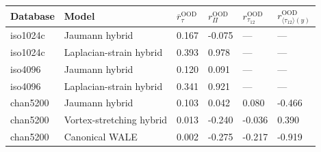 \begin{tabular}{llllll}
\toprule
Database & Model & $\overline{r}_{\tau}^{\mathrm{OOD}}$ & $r_{\Pi}^{\mathrm{OOD}}$ & $r_{\tau_{12}}^{\mathrm{OOD}}$ & $r_{\langle \tau_{12} \rangle (y)}^{\mathrm{OOD}}$ \\
\midrule
iso1024c & Jaumann hybrid & 0.167 & -0.075 & --- & --- \\
iso1024c & Laplacian-strain hybrid & 0.393 & 0.978 & --- & --- \\
iso4096 & Jaumann hybrid & 0.120 & 0.091 & --- & --- \\
iso4096 & Laplacian-strain hybrid & 0.341 & 0.921 & --- & --- \\
chan5200 & Jaumann hybrid & 0.103 & 0.042 & 0.080 & -0.466 \\
chan5200 & Vortex-stretching hybrid & 0.013 & -0.240 & -0.036 & 0.390 \\
chan5200 & Canonical WALE & 0.002 & -0.275 & -0.217 & -0.919 \\
\bottomrule
\end{tabular}
